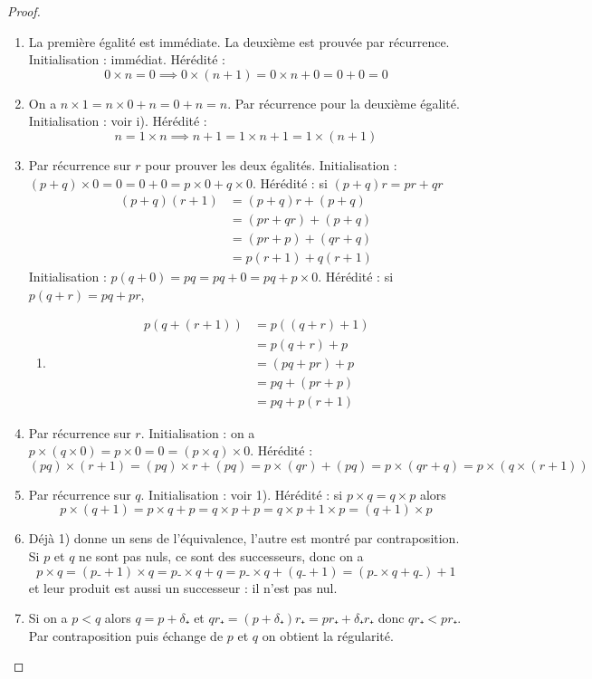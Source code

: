 \begin{proof}
\par\noindent
\begin{enumerate}
\item La première égalité est immédiate. La deuxième est prouvée par récurrence. Initialisation : immédiat. Hérédité :
%
\begin{equation*}
0×𝑛=0⟹0×(𝑛+1)=0×𝑛+0=0+0=0
\end{equation*}
\item On a \(𝑛×1=𝑛×0+𝑛=0+𝑛=𝑛\). Par récurrence pour la deuxième égalité. Initialisation : voir i). Hérédité :
%
\begin{equation*}
𝑛=1×𝑛⟹𝑛+1=1×𝑛+1=1×(𝑛+1)
\end{equation*}
\item Par récurrence sur \(𝑟\) pour prouver les deux égalités. Initialisation : \((𝑝+𝑞)×0=0=0+0=𝑝×0+𝑞×0\). Hérédité
: si \((𝑝+𝑞)𝑟=𝑝𝑟+𝑞𝑟\) 
%
\begin{align*}
(𝑝+𝑞)(𝑟+1)
&{}=
(𝑝+𝑞)𝑟+(𝑝+𝑞)
\\&{}=
(𝑝𝑟+𝑞𝑟)+(𝑝+𝑞)
\\&{}=
(𝑝𝑟+𝑝)+(𝑞𝑟+𝑞)
\\&{}=
𝑝(𝑟+1)+𝑞(𝑟+1)
\end{align*}
Initialisation : \(𝑝(𝑞+0)=𝑝𝑞=𝑝𝑞+0=𝑝𝑞+𝑝×0\). Hérédité : si \ \(𝑝(𝑞+𝑟)=𝑝𝑞+𝑝𝑟\),
%
\begin{enumerate}
\item[] %
\begin{align*}
𝑝(𝑞+(𝑟+1))
&{}=
𝑝((𝑞+𝑟)+1)
\\&{}=
𝑝(𝑞+𝑟)+𝑝
\\&{}=
(𝑝𝑞+𝑝𝑟)+𝑝
\\&{}=
𝑝𝑞+(𝑝𝑟+𝑝)
\\&{}=
𝑝𝑞+𝑝(𝑟+1)
\end{align*}
\end{enumerate}
\item Par récurrence sur \(𝑟\). Initialisation : on a \(𝑝×(𝑞×0)=𝑝×0=0=(𝑝×𝑞)×0\). Hérédité :
%
\begin{equation*}
(𝑝𝑞)×(𝑟+1)=(𝑝𝑞)×𝑟+(𝑝𝑞)=𝑝×(𝑞𝑟)+(𝑝𝑞)=𝑝×(𝑞𝑟+𝑞)=𝑝×(𝑞×(𝑟+1))
\end{equation*}
\item Par récurrence sur \(𝑞\). Initialisation : voir 1). Hérédité : si \(𝑝×𝑞=𝑞×𝑝\) alors
%
\begin{equation*}
𝑝×(𝑞+1)=𝑝×𝑞+𝑝=𝑞×𝑝+𝑝=𝑞×𝑝+1×𝑝=(𝑞+1)×𝑝
\end{equation*}
\item Déjà 1) donne un sens de l'équivalence, l'autre est montré par contraposition. Si \(𝑝\) et \(𝑞\) ne sont pas
nuls, ce sont des successeurs, donc on a
%
\begin{equation*}
𝑝×𝑞=(𝑝₋+1)×𝑞=𝑝₋×𝑞+𝑞=𝑝₋×𝑞+(𝑞₋+1)=(𝑝₋×𝑞+𝑞₋)+1
\end{equation*}
et leur produit est aussi un successeur : il n'est pas nul.
\item Si on a \(𝑝<𝑞\) alors \(𝑞=𝑝+𝛿₊\) et \(𝑞𝑟₊=(𝑝+𝛿₊)𝑟₊=𝑝𝑟₊+𝛿₊𝑟₊\) donc \(𝑞𝑟₊<𝑝𝑟₊\). Par
contraposition puis échange de \(𝑝\) et \(𝑞\) on obtient la régularité.
\end{enumerate}
\end{proof}
